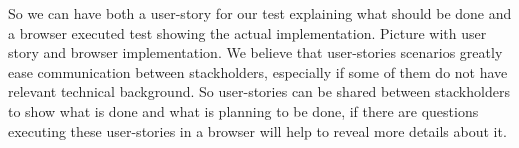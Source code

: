 So we can have both a user-story for our test explaining what should be done and a browser executed
test showing the actual implementation. Picture with user story and browser implementation. We believe that user-stories 
scenarios greatly ease communication between stackholders, 
especially if some of them do not have relevant technical background.
So user-stories can be shared between stackholders to show what is done and what is planning to be done, 
if there are questions executing these user-stories in a browser will help to reveal more details about it. 
   
   
   
    
